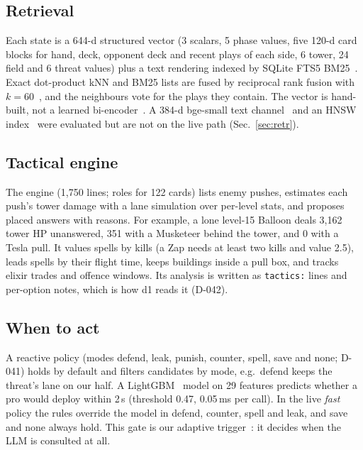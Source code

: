 \documentclass[conference]{IEEEtran}
\newcommand{\tw}[1]{\texttt{#1}}
\begin{document}
\subsection{Retrieval}
Each state is a 644-d structured vector (3 scalars, 5 phase values, five 120-d card blocks for hand, deck, opponent deck and recent plays of each side, 6 tower, 24 field and 6 threat values) plus a text rendering indexed by SQLite FTS5 BM25~\cite{robertson2009bm25}. Exact dot-product kNN and BM25 lists are fused by reciprocal rank fusion with $k=60$~\cite{cormack2009rrf}, and the neighbours vote for the plays they contain. The vector is hand-built, not a learned bi-encoder~\cite{lim2026l02}. A 384-d bge-small text channel~\cite{xiao2023cpack} and an HNSW index~\cite{malkov2020hnsw} were evaluated but are not on the live path (Sec.~\ref{sec:retr}). %

\subsection{Tactical engine}
The engine (1,750 lines; roles for 122 cards) lists enemy pushes, estimates each push's tower damage with a lane simulation over per-level stats, and proposes placed answers with reasons. For example, a lone level-15 Balloon deals 3,162 tower HP unanswered, 351 with a Musketeer behind the tower, and 0 with a Tesla pull. It values spells by kills (a Zap needs at least two kills and value 2.5), leads spells by their flight time, keeps buildings inside a pull box, and tracks elixir trades and offence windows. Its analysis is written as \tw{tactics:} lines and per-option notes, which is how d1 reads it (D-042). %

\subsection{When to act}
A reactive policy (modes defend, leak, punish, counter, spell, save and none; D-041) holds by default and filters candidates by mode, e.g.\ defend keeps the threat's lane on our half. A LightGBM~\cite{ke2017lightgbm} model on 29 features predicts whether a pro would deploy within 2\,s (threshold 0.47, 0.05\,ms per call). In the live \emph{fast} policy the rules override the model in defend, counter, spell and leak, and save and none always hold. This gate is our adaptive trigger~\cite{jiang2023flare}: it decides when the LLM is consulted at all. %
\end{document}
